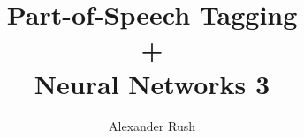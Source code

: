 \documentclass{beamer}
\title{Part-of-Speech Tagging \\ + \\ Neural Networks 3}
\author{Alexander Rush}
\begin{document}
\begin{frame}
  \titlepage
\end{frame}
\end{document}
